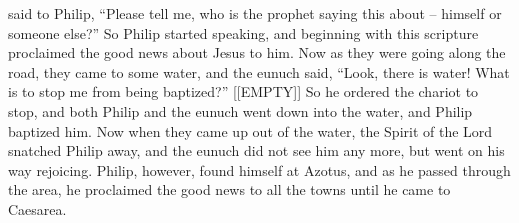 {said
to Philip,
“Please tell
me, who
is the prophet
saying
this
about
– himself
or
someone
else?”
So
Philip
started speaking,
and
beginning
with
this
scripture
proclaimed the good news
about Jesus
to him.
Now as
they were going
along
the road,
they came
to
some
water,
and
the eunuch
said,
“Look,
there is water! What
is to stop
me
from being baptized?”
[[EMPTY]]
So
he ordered
the chariot
to stop,
and
both
Philip
and
the eunuch
went down
into
the water,
and
Philip baptized
him.
Now
when
they came up
out of
the water,
the Spirit
of the Lord
snatched
Philip
away,
and
the eunuch
did
not
see
him
any more,
but
went on
his
way
rejoicing.
Philip,
however, found
himself at
Azotus,
and
as
he passed through
the area, he proclaimed the good news
to all
the towns
until
he
came
to
Caesarea.

}
